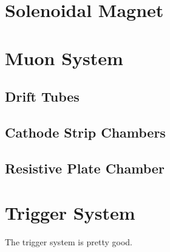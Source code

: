 \section{Solenoidal Magnet}
\section{Muon System}
\subsection{Drift Tubes}
\subsection{Cathode Strip Chambers}
\subsection{Resistive Plate Chamber}

\section{Trigger System}
The trigger system is pretty good.\cite{CMS-TRG-12-001}
